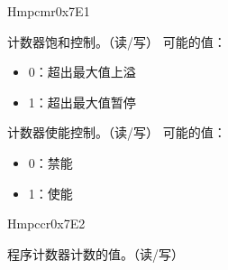 \begin{register}{H}{mpcmr}{0x7E1}\label{regdesc:MPCMR}
%
%
%
\regnewline%
\begin{regdesc}\begin{reglist}
\label{fielddesc:COUNTER_SATURATION}\item [COUNT\_SAT] 计数器饱和控制。（读/写）
\newline 可能的值：
\begin{itemize}
    \setlength\itemsep{-1em}
    \item 0：超出最大值上溢
    \item 1：超出最大值暂停
\end{itemize}
\label{fielddesc:COUNTER_ENABLE}\item [COUNT\_EN] 计数器使能控制。（读/写）
\newline 可能的值：
\begin{itemize}
    \setlength\itemsep{-1em}
    \item 0：禁能
    \item 1：使能
\end{itemize}
\end{reglist}\end{regdesc}
\end{register}

\begin{register}{H}{mpccr}{0x7E2}\label{regdesc:MPCCR}
%
\regnewline%
\begin{regdesc}\begin{reglist}
\label{fielddesc:MPCCR}\item [MPCCR] 程序计数器计数的值。（读/写）
\end{reglist}\end{regdesc}
\end{register}

